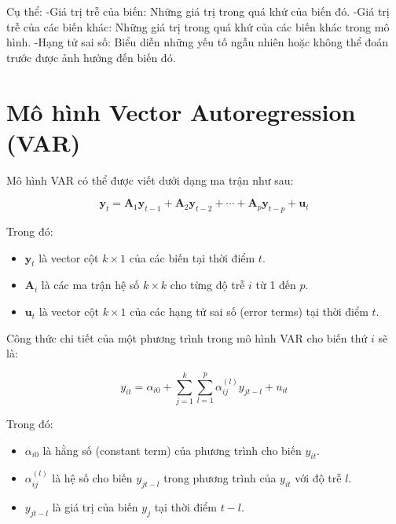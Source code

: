 \documentclass[conference]{IEEEtran}
\begin{document}
	Cụ thể:
	-Giá trị trễ của biến: Những giá trị trong quá khứ của biến đó.
	-Giá trị trễ của các biến khác: Những giá trị trong quá khứ của các biến khác trong mô hình.
	-Hạng tử sai số: Biểu diễn những yếu tố ngẫu nhiên hoặc không thể đoán trước được ảnh hưởng đến biến đó.
	
	
	
	\section*{Mô hình Vector Autoregression (VAR)}
	
	Mô hình VAR có thể được viết dưới dạng ma trận như sau:
	
	\[
	\mathbf{y}_t = \mathbf{A}_1 \mathbf{y}_{t-1} + \mathbf{A}_2 \mathbf{y}_{t-2} + \cdots + \mathbf{A}_p \mathbf{y}_{t-p} + \mathbf{u}_t
	\]
	
	Trong đó:
	\begin{itemize}
		\item \(\mathbf{y}_t\) là vector cột \( k \times 1 \) của các biến tại thời điểm \( t \).
		\item \(\mathbf{A}_i\) là các ma trận hệ số \( k \times k \) cho từng độ trễ \( i \) từ 1 đến \( p \).
		\item \(\mathbf{u}_t\) là vector cột \( k \times 1 \) của các hạng tử sai số (error terms) tại thời điểm \( t \).
	\end{itemize}
	
	Công thức chi tiết của một phương trình trong mô hình VAR cho biến thứ \( i \) sẽ là:
	
	\[
	y_{it} = \alpha_{i0} + \sum_{j=1}^{k} \sum_{l=1}^{p} \alpha_{ij}^{(l)} y_{jt-l} + u_{it}
	\]
	
	Trong đó:
	\begin{itemize}
		\item \(\alpha_{i0}\) là hằng số (constant term) của phương trình cho biến \( y_{it} \).
		\item \(\alpha_{ij}^{(l)}\) là hệ số cho biến \( y_{jt-l} \) trong phương trình của \( y_{it} \) với độ trễ \( l \).
		\item \( y_{jt-l} \) là giá trị của biến \( y_j \) tại thời điểm \( t-l \).
	\end{itemize}
	
\end{document}
